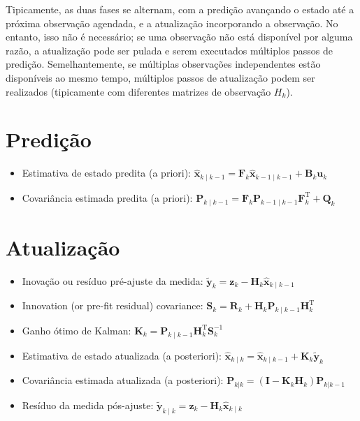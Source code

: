 Tipicamente, as duas fases se alternam, com a predição avançando o estado até a próxima observação agendada, e a atualização incorporando a observação. No entanto, isso não é necessário; se uma observação não está disponível por alguma razão, a atualização pode ser pulada e serem executados múltiplos passos de predição. Semelhantemente, se múltiplas observações independentes estão disponíveis ao mesmo tempo, múltiplos passos de atualização podem ser realizados (tipicamente com diferentes matrizes de observação $H_k$).

\section{Predição}
\begin{itemize}
  \item Estimativa de estado predita (a priori): ${\displaystyle {\hat {\mathbf {x} }}_{k\mid k-1}=\mathbf {F} _{k}{\hat {\mathbf {x} }}_{k-1\mid k-1}+\mathbf {B} _{k}\mathbf {u} _{k}}$
  \item Covariância estimada predita (a priori): ${\displaystyle \mathbf {P} _{k\mid k-1}=\mathbf {F} _{k}\mathbf {P} _{k-1\mid k-1}\mathbf {F} _{k}^{\mathrm {T} }+\mathbf {Q} _{k}}$
\end{itemize}

\section{Atualização}
\begin{itemize}
  \item Inovação ou resíduo pré-ajuste da medida: ${\displaystyle {\tilde {\mathbf {y} }}_{k}=\mathbf {z} _{k}-\mathbf {H} _{k}{\hat {\mathbf {x} }}_{k\mid k-1}}$
  \item Innovation (or pre-fit residual) covariance: ${\displaystyle \mathbf {S} _{k}=\mathbf {R} _{k}+\mathbf {H} _{k}\mathbf {P} _{k\mid k-1}\mathbf {H} _{k}^{\mathrm {T} }}$
  \item Ganho ótimo de Kalman: ${\displaystyle \mathbf {K} _{k}=\mathbf {P} _{k\mid k-1}\mathbf {H} _{k}^{\mathrm {T} }\mathbf {S} _{k}^{-1}}$
  \item Estimativa de estado atualizada (a posteriori): ${\displaystyle {\hat {\mathbf {x} }}_{k\mid k}={\hat {\mathbf {x} }}_{k\mid k-1}+\mathbf {K} _{k}{\tilde {\mathbf {y} }}_{k}}$
  \item Covariância estimada atualizada (a posteriori): ${\displaystyle \mathbf {P} _{k|k}=(\mathbf {I} -\mathbf {K} _{k}\mathbf {H} _{k})\mathbf {P} _{k|k-1}}$
  \item Resíduo da medida pós-ajuste: ${\displaystyle {\tilde {\mathbf {y} }}_{k\mid k}=\mathbf {z} _{k}-\mathbf {H} _{k}{\hat {\mathbf {x} }}_{k\mid k}}$
\end{itemize}

